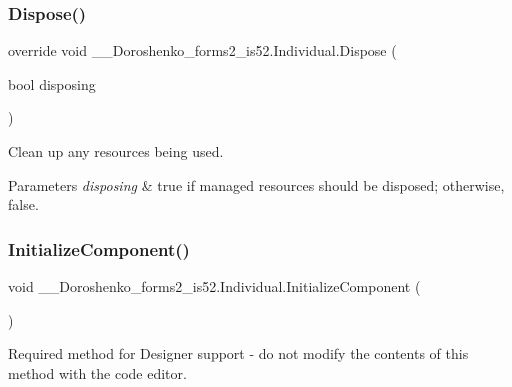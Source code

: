 \subsubsection{\texorpdfstring{Dispose()}{Dispose()}}
{\footnotesize\ttfamily override void \+\_\+\_\+\+Doroshenko\+\_\+forms2\+\_\+is52.\+Individual.\+Dispose (\begin{DoxyParamCaption}\item[{bool}]{disposing }\end{DoxyParamCaption})\hspace{0.3cm}{\ttfamily [protected]}}



Clean up any resources being used. 


\begin{DoxyParams}{Parameters}
{\em disposing} & true if managed resources should be disposed; otherwise, false.\\
\hline
\end{DoxyParams}
\hypertarget{class__7___doroshenko__forms2__is52_1_1_individual_aa5f3989e9a76bfe28e9848301f701e6a}{}\label{class__7___doroshenko__forms2__is52_1_1_individual_aa5f3989e9a76bfe28e9848301f701e6a} 
\subsubsection{\texorpdfstring{Initialize\+Component()}{InitializeComponent()}}
{\footnotesize\ttfamily void \+\_\+\_\+\+Doroshenko\+\_\+forms2\+\_\+is52.\+Individual.\+Initialize\+Component (\begin{DoxyParamCaption}{ }\end{DoxyParamCaption})\hspace{0.3cm}{\ttfamily [private]}}



Required method for Designer support -\/ do not modify the contents of this method with the code editor. 

